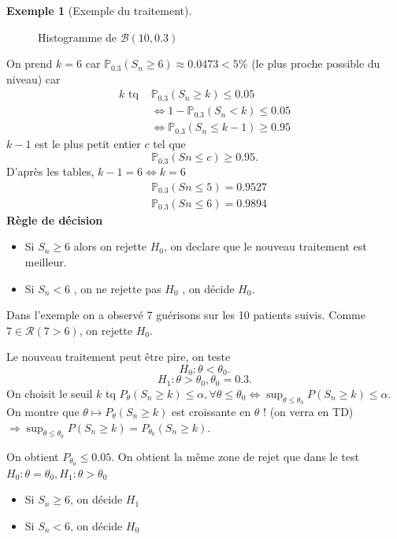 \documentclass{article}
\theoremstyle{plain}%
\theoremstyle{definition}
\newtheorem{exmp}{Exemple}[section]
\theoremstyle{remark}
\begin{document}
\begin{exmp}[Exemple du traitement]
    \begin{figure}[htbp]
        \centering
        \caption{Histogramme de $ \mathcal{B}(10, 0.3) $ }
        \label{}
    \end{figure}
    
    On prend $ k=6 $ car $ \mathbb{P}_{0.3}(S_n \geq 6) \approx 0.0473 < 5\% $ (le plus proche possible du niveau) car \begin{align*}
        k \text{ tq } & \mathbb{P}_{0.3}(S_n \geq k) \leq 0.05 \\
                    & \Leftrightarrow 1 - \mathbb{P}_{0.3}(S_n < k) \leq 0.05 \\
                    & \Leftrightarrow \mathbb{P}_{0.3}(S_n \leq k-1) \geq 0.95
    \end{align*}
    $ k-1 $ est le plus petit entier $ c $ tel que 
    \[
        \mathbb{P}_{0.3}(Sn \leq c) \geq 0.95
    .\]
    D'après les tables, $ k-1 = 6 \Leftrightarrow k=6 $ 
    \begin{align*}
        & \mathbb{P}_{0.3}(Sn \leq 5) = 0.9527\\
        & \mathbb{P}_{0.3}(Sn \leq 6) = 0.9894
    \end{align*}
    \textbf{Règle de décision}\begin{itemize}
        \item Si $ S_n \geq 6 $ alors on rejette $ H_0 $, on declare que le nouveau traitement est meilleur.
        \item Si $ S_n <6 $ , on ne rejette pas $ H_0 $ , on décide $ H_0 $. 
    \end{itemize}
    Dans l'exemple on a observé 7 guérisons sur les 10 patients suivis. Comme $ 7 \in \mathcal{R} (7>6) $, on rejette $ H_0 $.

    Le nouveau traitement peut être pire, on teste 
    \[
        H_0 : \theta < \theta _0
    .\]
    \[
        H_1 : \theta > \theta _0, \theta _0 = 0.3
    .\]
    On choisit le seuil $ k $ tq $ P_\theta (S_n \geq k) \leq \alpha , \forall \theta \leq \theta _0 \Leftrightarrow \sup _{\theta \leq \theta _0} P(S_n \geq k) \leq \alpha $.\\
    On montre que $ \theta \mapsto P_\theta (S_n \geq k) $ est croissante en $ \theta  $ ! (on verra en TD) $\Rightarrow \sup _{\theta \leq \theta _0} P(S_n \geq k) = P_{\theta _0} (S_n \geq k)$. 
    
    On obtient $ P_{\theta_0} \leq 0.05 $. On obtient la même zone de rejet que dans le test $ H_0: \theta = \theta _0, H_1: \theta > \theta _0$ 
    \begin{itemize}
        \item Si $ S_n \geq 6 $, on décide $ H_1 $ 
        \item Si $ S_n < 6 $, on décide $ H_0 $ 
    \end{itemize}
\end{exmp}
\end{document}
